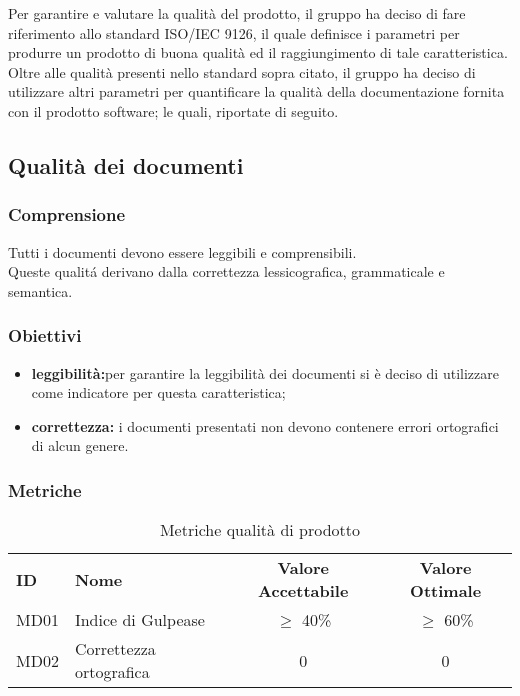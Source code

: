 Per garantire e valutare la qualità del prodotto, il gruppo ha deciso di fare riferimento allo standard ISO/IEC 9126, il quale definisce i parametri per produrre un prodotto di buona qualità ed il raggiungimento di tale caratteristica. \\
Oltre alle qualità presenti nello standard sopra citato, il gruppo ha deciso di utilizzare altri parametri per quantificare la qualità della documentazione fornita con il prodotto software; le quali, riportate di seguito.

\subsection{Qualità dei documenti}

\subsubsection{Comprensione}
Tutti i documenti devono essere leggibili e comprensibili.\\
Queste qualitá derivano dalla correttezza lessicografica, grammaticale e semantica.

\subsubsection{Obiettivi}
\begin{itemize}
    \item \textbf{leggibilità:}per garantire la leggibilità dei documenti si è deciso di utilizzare  come indicatore per questa caratteristica;
    \item \textbf{correttezza:} i documenti presentati non devono contenere errori ortografici di alcun genere.
\end{itemize}

\subsubsection{Metriche}

\begin{table} [h!]
	\begin{center}
		\begin{tabular} {m{2 cm} m{7 cm} c c }
			\rowcolor{lightgray}
			\textbf{ID} & \textbf{Nome}& \textbf{Valore Accettabile} & \textbf{Valore Ottimale}\\
			MD01 & Indice di Gulpease  		 & $\geq$ 40\%    			& $\geq$ 60\% \\
			MD02 & Correttezza ortografica 				&0						&0
		\end{tabular}
	\caption{Metriche qualità di prodotto}
	\end{center}
\end{table}